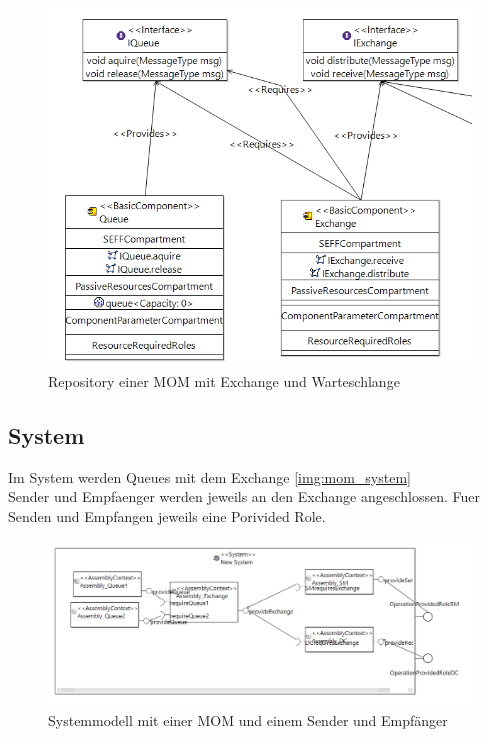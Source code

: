 \begin{figure}
\center
  \includegraphics[width=1\textwidth]{images/mom_repository.png}
  \caption{Repository einer MOM mit Exchange und Warteschlange}
  \label{img:mom_repository}
\end{figure}

\subsection{System}
Im System werden Queues mit dem Exchange \autoref{img:mom_system}\\
Sender und Empfaenger werden jeweils an den Exchange angeschlossen. Fuer Senden und Empfangen jeweils eine Porivided Role.

\begin{figure}
\center
  \includegraphics[width=1\textwidth]{images/mom_system.png}
  \caption{Systemmodell mit einer MOM und einem Sender und Empfänger}
  \label{img:mom_system}
\end{figure}

